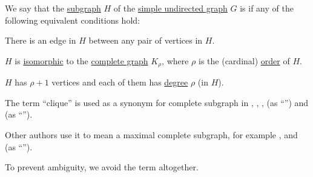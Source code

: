 \begin{definition}\label{def:complete_subgraph}\mimprovised
  We say that the \hyperref[def:undirected_graph/subobject]{subgraph} \( H \) of the \hyperref[def:undirected_graph]{simple undirected graph} \( G \) is  if any of the following equivalent conditions hold:
  \begin{thmenum}
     There is an edge in \( H \) between any pair of vertices in \( H \).

     \( H \) is \hyperref[def:undirected_graph/morphism]{isomorphic} to the \hyperref[def:complete_graph]{complete graph} \( K_\rho \), where \( \rho \) is the (cardinal) \hyperref[def:graph_cardinality/order]{order} of \( H \).

     \( H \) has \( \rho + 1 \) vertices and each of them has \hyperref[def:graph_cardinality/undirected_degree]{degree} \( \rho \) (in \( H \)).
  \end{thmenum}
\end{definition}
\begin{comments}
  \item The term \enquote{clique} is used as a synonym for complete subgraph in
  \cite[def. 1.4.11]{Knauer2019AlgebraicGraphTheory},
  \cite[5]{GondranMinoux1984GraphsAndAlgorithms},
  \cite[394]{Erickson2019Algorithms},
  \cite[111]{ЕмеличевИПр1990ТеорияГрафов} (as \enquote{}) and
  \cite[\S 7.3.1]{Новиков2013ДискретнаяМатематика} (as \enquote{}).

  Other authors use it to mean a maximal complete subgraph, for example
  \cite[20]{Harary1969GraphTheory},
  \cite[112]{Bollobás1998ModernGraphTheory} and
  \cite[103]{Мирчев2001Графи} (as \enquote{}).

  To prevent ambiguity, we avoid the term altogether.
\end{comments}
